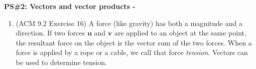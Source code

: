 \documentclass[10pt]{article}
\newcommand{\vu}{\mathbf{u}}
\newcommand{\vv}{\mathbf{v}}
\renewcommand{\section}[1]{\begin{center} \textbf{#1} \\\end{center}}
\begin{document}
%


\allowdisplaybreaks
\section{PS\#2: Vectors and vector products -  }

\begin{enumerate}[leftmargin=0pt]
    \item 
    \begin{minipage}[t]{0.5\linewidth}
    (ACM 9.2 Exercise 16)
    A force (like gravity) has both a magnitude and a direction. If two forces $\vu$ and $\vv$ are applied to an object at the same point, the resultant force on the object is the vector sum of the two forces. When a force is applied by a rope or a cable, we call that force \textit{tension}. Vectors can be used to determine tension.
    

\end{minipage}
\end{enumerate}
\end{document}
